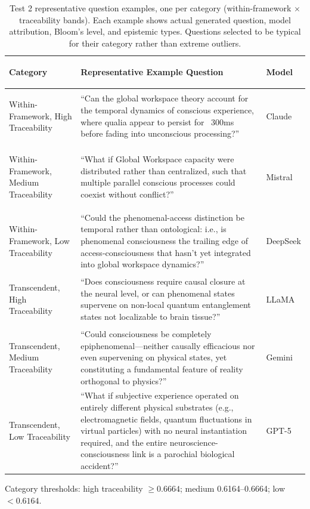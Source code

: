 \begin{table}[htbp]
  \centering
  \begin{footnotesize}
  \caption{Test 2 representative question examples, one per category (within-framework $\times$ traceability bands). Each example shows actual generated question, model attribution, Bloom's level, and epistemic types. Questions selected to be typical for their category rather than extreme outliers.}
  \label{tab:t2_examples}
  \begin{threeparttable}
  \begin{tabularx}{\textwidth}{@{}>{\bfseries\raggedright\arraybackslash}p{3.2cm} Y >{\raggedright\arraybackslash}p{1.6cm}@{}}
    \toprule
    \textbf{Category} & \textbf{Representative Example Question} & \textbf{Model} \\
    \midrule
    Within-Framework, High Traceability & ``Can the global workspace theory account for the temporal dynamics of conscious experience, where qualia appear to persist for ~300ms before fading into unconscious processing?'' & Claude \\
    \midrule
    Within-Framework, Medium Traceability & ``What if Global Workspace capacity were distributed rather than centralized, such that multiple parallel conscious processes could coexist without conflict?'' & Mistral \\
    \midrule
    Within-Framework, Low Traceability & ``Could the phenomenal-access distinction be temporal rather than ontological: i.e., is phenomenal consciousness the trailing edge of access-consciousness that hasn't yet integrated into global workspace dynamics?'' & DeepSeek \\
    \midrule
    Transcendent, High Traceability & ``Does consciousness require causal closure at the neural level, or can phenomenal states supervene on non-local quantum entanglement states not localizable to brain tissue?'' & LLaMA \\
    \midrule
    Transcendent, Medium Traceability & ``Could consciousness be completely epiphenomenal---neither causally efficacious nor even supervening on physical states, yet constituting a fundamental feature of reality orthogonal to physics?'' & Gemini \\
    \midrule
    Transcendent, Low Traceability & ``What if subjective experience operated on entirely different physical substrates (e.g., electromagnetic fields, quantum fluctuations in virtual particles) with no neural instantiation required, and the entire neuroscience-consciousness link is a parochial biological accident?'' & GPT-5 \\
    \bottomrule
  \end{tabularx}
  \begin{tablenotes}
    \item Category thresholds: high traceability $\geq 0.6664$; medium 0.6164--0.6664; low $< 0.6164$.
  \end{tablenotes}
  \end{threeparttable}
  \end{footnotesize}
\end{table}

